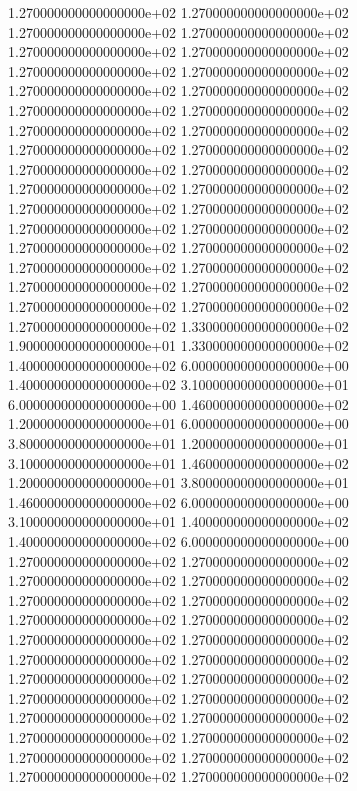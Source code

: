 1.270000000000000000e+02 1.270000000000000000e+02 1.270000000000000000e+02 1.270000000000000000e+02 1.270000000000000000e+02 1.270000000000000000e+02 1.270000000000000000e+02 1.270000000000000000e+02 1.270000000000000000e+02 1.270000000000000000e+02 1.270000000000000000e+02 1.270000000000000000e+02 1.270000000000000000e+02 1.270000000000000000e+02 1.270000000000000000e+02 1.270000000000000000e+02 1.270000000000000000e+02 1.270000000000000000e+02 1.270000000000000000e+02 1.270000000000000000e+02 1.270000000000000000e+02 1.270000000000000000e+02 1.270000000000000000e+02 1.270000000000000000e+02 1.270000000000000000e+02 1.270000000000000000e+02 1.270000000000000000e+02 1.270000000000000000e+02 1.270000000000000000e+02 1.270000000000000000e+02 1.270000000000000000e+02 1.270000000000000000e+02 1.270000000000000000e+02 1.330000000000000000e+02 1.900000000000000000e+01 1.330000000000000000e+02 1.400000000000000000e+02 6.000000000000000000e+00 1.400000000000000000e+02 3.100000000000000000e+01 6.000000000000000000e+00 1.460000000000000000e+02 1.200000000000000000e+01 6.000000000000000000e+00 3.800000000000000000e+01 1.200000000000000000e+01 3.100000000000000000e+01 1.460000000000000000e+02 1.200000000000000000e+01 3.800000000000000000e+01 1.460000000000000000e+02 6.000000000000000000e+00 3.100000000000000000e+01 1.400000000000000000e+02 1.400000000000000000e+02 6.000000000000000000e+00 1.270000000000000000e+02 1.270000000000000000e+02 1.270000000000000000e+02 1.270000000000000000e+02 1.270000000000000000e+02 1.270000000000000000e+02 1.270000000000000000e+02 1.270000000000000000e+02 1.270000000000000000e+02 1.270000000000000000e+02 1.270000000000000000e+02 1.270000000000000000e+02 1.270000000000000000e+02 1.270000000000000000e+02 1.270000000000000000e+02 1.270000000000000000e+02 1.270000000000000000e+02 1.270000000000000000e+02 1.270000000000000000e+02 1.270000000000000000e+02 1.270000000000000000e+02 1.270000000000000000e+02 1.270000000000000000e+02 1.270000000000000000e+02
